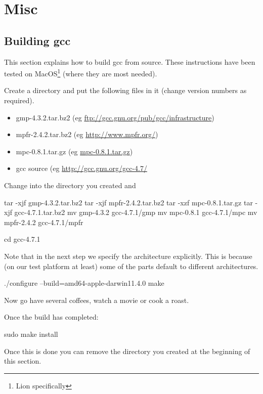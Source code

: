 \chapter{Misc}


\section{Building gcc}\label{sec:gccbuilding}
This section explains how to build gcc from source.
These instructions have been tested on MacOS\footnote{Lion specifically} (where they are most needed).

Create a directory and put the following files in it (change version numbers as required).
\begin{itemize}
 \item gmp-4.3.2.tar.bz2 (eg \url{ftp://gcc.gnu.org/pub/gcc/infrastructure})
 \item mpfr-2.4.2.tar.bz2 (eg \url{http://www.mpfr.org/})
 \item mpc-0.8.1.tar.gz (eg \url{mpc-0.8.1.tar.gz})
 \item gcc source (eg \url{http://gcc.gnu.org/gcc-4.7/}
\end{itemize}

Change into the directory you created and
\begin{shellCode}
tar -xjf gmp-4.3.2.tar.bz2
tar -xjf mpfr-2.4.2.tar.bz2
tar -xzf mpc-0.8.1.tar.gz
tar -xjf gcc-4.7.1.tar.bz2
mv gmp-4.3.2 gcc-4.7.1/gmp
mv mpc-0.8.1 gcc-4.7.1/mpc
mv mpfr-2.4.2 gcc-4.7.1/mpfr

cd gcc-4.7.1
\end{shellCode}

\noindent Note that in the next step we specify the architecture explicitly.
This is because (on our test platform at least) some of the parts default to different architectures.

\begin{shellCode}
./configure --build=amd64-apple-darwin11.4.0
make 
\end{shellCode}

\noindent Now go have several coffees, watch a movie or cook a roast.

\noindent Once the build has completed:
\begin{shellCode}
sudo make install 
\end{shellCode}

\noindent Once this is done you can remove the directory you created at the beginning of this section.
